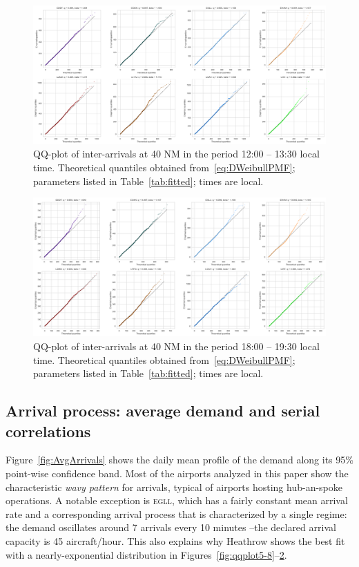 \documentclass[]{elsarticle}
\newcommand{\airp}[1]{\textcolor{#1}{\textsc{#1}}}
\begin{document}
\begin{figure}
    \includegraphics[width=\textwidth]{IA_qqplot1200-1330}
    \caption{QQ-plot of inter-arrivals at 40 NM in the period 12:00 -- 13:30 local time. Theoretical quantiles obtained from~\eqref{eq:DWeibullPMF}; parameters listed in Table~\ref{tab:fitted}; times are local.}
    \label{fig:qqplot5-11}
\end{figure}

\begin{figure}
    \includegraphics[width=\textwidth]{IA_qqplot1800-1930}
    \caption{QQ-plot of inter-arrivals at 40 NM in the period 18:00 -- 19:30 local time. Theoretical quantiles obtained from~\eqref{eq:DWeibullPMF}; parameters listed in Table~\ref{tab:fitted}; times are local.}
    \label{fig:qqplot5-17}
\end{figure}

\subsection{Arrival process: average demand and serial correlations}
\label{sec:serial_corr}

Figure~\ref{fig:AvgArrivals} shows the daily mean profile of the demand along its 95\% point-wise confidence band.
Most of the airports analyzed in this paper show the characteristic \emph{wavy pattern} for arrivals, typical of airports hosting hub-an-spoke operations.
A notable exception is \airp{egll}, which has a fairly constant mean arrival rate and a corresponding arrival process that is characterized by a single regime: the demand oscillates around 7 arrivals every 10 minutes --the declared arrival capacity is 45 aircraft/hour.
This also explains why Heathrow shows the best fit with a nearly-exponential distribution in Figures~\ref{fig:qqplot5-8}--\ref{fig:qqplot5-17}.
\end{document}
